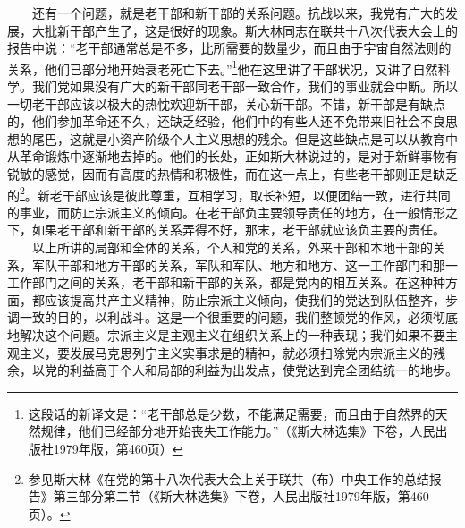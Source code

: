 \documentclass[cn,11pt,chinese]{elegantbook}
\begin{document}
　　还有一个问题，就是老干部和新干部的关系问题。抗战以来，我党有广大的发展，大批新干部产生了，这是很好的现象。斯大林同志在联共十八次代表大会上的报告中说：“老干部通常总是不多，比所需要的数量少，而且由于宇宙自然法则的关系，他们已部分地开始衰老死亡下去。”\footnote[7]{ 这段话的新译文是：“老干部总是少数，不能满足需要，而且由于自然界的天然规律，他们已经部分地开始丧失工作能力。”（《斯大林选集》下卷，人民出版社1979年版，第460页）}他在这里讲了干部状况，又讲了自然科学。我们党如果没有广大的新干部同老干部一致合作，我们的事业就会中断。所以一切老干部应该以极大的热忱欢迎新干部，关心新干部。不错，新干部是有缺点的，他们参加革命还不久，还缺乏经验，他们中的有些人还不免带来旧社会不良思想的尾巴，这就是小资产阶级个人主义思想的残余。但是这些缺点是可以从教育中从革命锻炼中逐渐地去掉的。他们的长处，正如斯大林说过的，是对于新鲜事物有锐敏的感觉，因而有高度的热情和积极性，而在这一点上，有些老干部则正是缺乏的\footnote[8]{ 参见斯大林《在党的第十八次代表大会上关于联共（布）中央工作的总结报告》第三部分第二节（《斯大林选集》下卷，人民出版社1979年版，第460页）。}。新老干部应该是彼此尊重，互相学习，取长补短，以便团结一致，进行共同的事业，而防止宗派主义的倾向。在老干部负主要领导责任的地方，在一般情形之下，如果老干部和新干部的关系弄得不好，那末，老干部就应该负主要的责任。\\
　　以上所讲的局部和全体的关系，个人和党的关系，外来干部和本地干部的关系，军队干部和地方干部的关系，军队和军队、地方和地方、这一工作部门和那一工作部门之间的关系，老干部和新干部的关系，都是党内的相互关系。在这种种方面，都应该提高共产主义精神，防止宗派主义倾向，使我们的党达到队伍整齐，步调一致的目的，以利战斗。这是一个很重要的问题，我们整顿党的作风，必须彻底地解决这个问题。宗派主义是主观主义在组织关系上的一种表现；我们如果不要主观主义，要发展马克思列宁主义实事求是的精神，就必须扫除党内宗派主义的残余，以党的利益高于个人和局部的利益为出发点，使党达到完全团结统一的地步。\\
\end{document}
